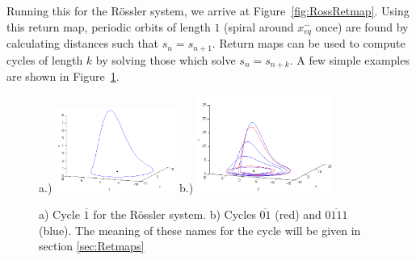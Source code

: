 \documentclass[10pt,letter]{article}
\begin{document}
Running this for the R\"ossler system, we arrive at
Figure~\ref{fig:RossRetmap}.  Using this return map, periodic orbits of
length $1$ (spiral around $x_{eq}^{-}$ once) are found by calculating
distances such that $s_n = s_{n+1}$.  Return maps can be used to compute
cycles of length $k$ by solving those which solve $s_n = s_{n+k}$.  A few
simple examples are shown in Figure~\ref{fig:RossPO}.

\begin{figure}[h]
\centering
a.)  \includegraphics[width=0.35\textwidth]{Figs/Section1/kcross1cyclec.png}
b.)
  \includegraphics[width=0.40\textwidth]{Figs/Section1/kcross24cyclesc.png}
\caption{
a) Cycle $\overline{1}$ for the R\"ossler system.
b) Cycles $\overline{01}$ (red) and $\overline{0111}$ (blue).  The
meaning of these names for the cycle will be given in section
\ref{sec:Retmaps}}
 \label{fig:RossPO}
\end{figure}
\end{document}
